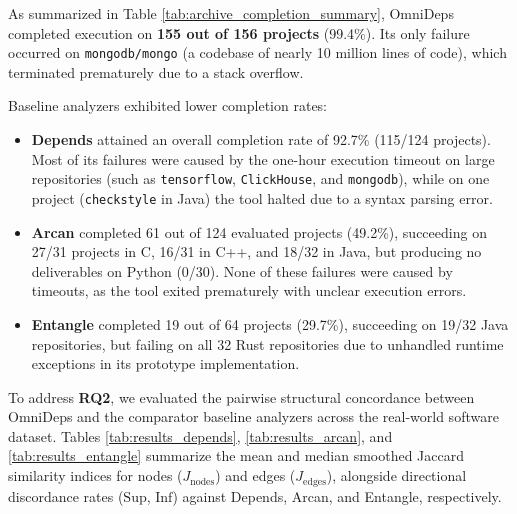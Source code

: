 As summarized in Table \ref{tab:archive_completion_summary}, OmniDeps
completed execution on \textbf{155 out of 156 projects} (99.4\%). Its
only failure occurred on \texttt{mongodb/mongo} (a codebase of nearly
10 million lines of code), which terminated prematurely due to a stack
overflow.

Baseline analyzers exhibited lower completion rates:
\begin{itemize}
  \item \textbf{Depends} attained an overall completion rate of 92.7\%
    (115/124 projects). Most of its failures were caused by the one-hour
    execution timeout on large repositories (such as \texttt{tensorflow},
    \texttt{ClickHouse}, and \texttt{mongodb}), while on one project
    (\texttt{checkstyle} in Java) the tool halted due to a syntax
    parsing error.
  \item \textbf{Arcan} completed 61 out of 124 evaluated projects (49.2\%),
    succeeding on 27/31 projects in C, 16/31 in C++, and 18/32 in Java, but
    producing no deliverables on Python (0/30). None of these failures were
    caused by timeouts, as the tool exited prematurely with unclear
    execution errors.
  \item \textbf{Entangle} completed 19 out of 64 projects (29.7\%),
    succeeding on 19/32 Java repositories, but failing on all 32 Rust
    repositories due to unhandled runtime exceptions in its prototype
    implementation.
\end{itemize}

To address \textbf{RQ2}, we evaluated the pairwise structural
concordance between OmniDeps and the comparator baseline analyzers
across the real-world software dataset. Tables
\ref{tab:results_depends}, \ref{tab:results_arcan}, and
\ref{tab:results_entangle} summarize the mean and median
smoothed Jaccard similarity indices for nodes ($J_{\text{nodes}}$)
and edges ($J_{\text{edges}}$), alongside directional discordance
rates ($\text{Sup}$, $\text{Inf}$) against Depends, Arcan, and
Entangle, respectively.


